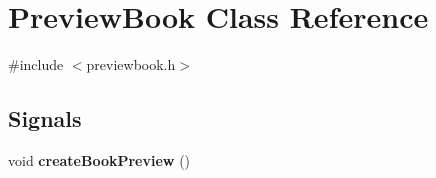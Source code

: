 \hypertarget{classPreviewBook}{
\section{PreviewBook Class Reference}
\label{classPreviewBook}
}


{\ttfamily \#include $<$previewbook.h$>$}

\subsection*{Signals}
\begin{DoxyCompactItemize}
\item 
\hypertarget{classPreviewBook_a31deeffb82e8702824ee8ba6bcab7b4c}{
void {\bfseries createBookPreview} ()}
\label{classPreviewBook_a31deeffb82e8702824ee8ba6bcab7b4c}

\end{DoxyCompactItemize}
